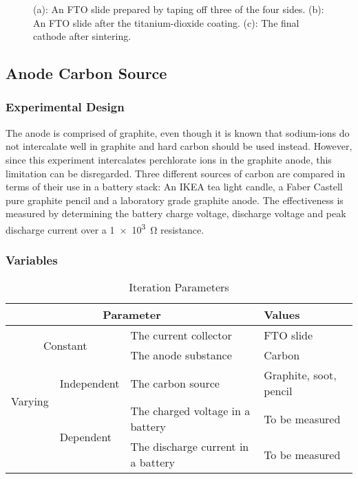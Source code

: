 \begin{figure}[ht!]
\centering
{}
\caption{(a): An FTO slide prepared by taping off three of the four sides. (b): An FTO slide after the titanium-dioxide coating. (c): The final cathode after sintering.}
\label{fig:cathodeprocess}
\end{figure}

\newpage

\subsection{Anode Carbon Source}
\subsubsection{Experimental Design} 
The anode is comprised of graphite, even though it is known that sodium-ions do not intercalate well in graphite and hard carbon should be used instead\cite{Xie2020}. However, since this experiment intercalates perchlorate ions in the graphite anode, this limitation can be disregarded. 
Three different sources of carbon are compared in terms of their use in a battery stack: An IKEA tea light candle, a Faber Castell pure graphite pencil and a laboratory grade graphite anode\cite{Ikea2022, Castell2022}.
The effectiveness is measured by determining the battery charge voltage, discharge voltage and peak discharge current over a \SI{1e3}{\ohm} resistance.

\subsubsection{Variables}
\begin{table}[h]
\renewcommand{\arraystretch}{1.3}
\caption{Iteration Parameters}
\label{table:parametersanode}
\centering
\begin{tabular}{l|l|l||l}
\multicolumn{3}{c||}{\bfseries Parameter}&\bfseries Values\\
\hline
\hline
\multicolumn{2}{c|}{\multirow{2}{*}{Constant}}&The current collector&FTO slide\\
\cline{3-4}
\multicolumn{2}{c|}{}&The anode substance&Carbon\\
\hline\hline
\multirow{2}{*}{Varying}&Independent&The carbon source&Graphite, soot, pencil\\
\cline{2-4}
&\multirow{2}{*}{Dependent}&The charged voltage in a battery&To be measured\\
\cline{3-4}
&&The discharge current in a battery&To be measured\\
\end{tabular}
\end{table}
    
